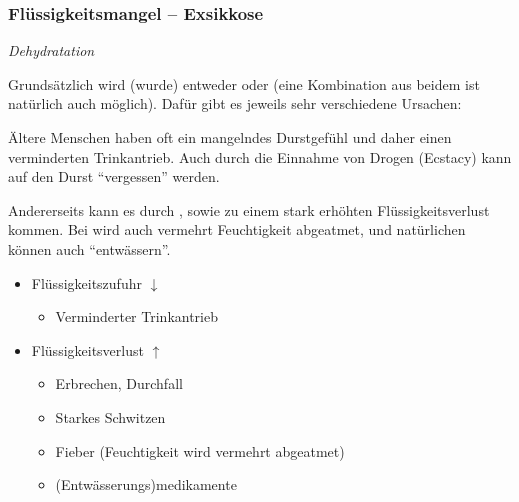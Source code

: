 






\subsubsection{Flüssigkeitsmangel -- Exsikkose}

\emph{ Dehydratation}


Grundsätzlich wird (wurde) entweder 
oder  (eine Kombination aus
beidem ist natürlich auch möglich). Dafür gibt es jeweils sehr verschiedene Ursachen: 

{%
Ältere Menschen haben oft ein mangelndes Durstgefühl und daher
einen verminderten Trinkantrieb. Auch durch die Einnahme von
Drogen (Ecstacy) kann auf den Durst "`vergessen"' werden.  

Andererseits kann es durch , 
sowie  zu einem stark erhöhten
Flüssigkeitsverlust kommen. Bei  wird auch
vermehrt Feuchtigkeit abgeatmet, und natürlichen können
auch  "`entwässern"'.
}{
\begin{itemize} %
  \item Flüssigkeitszufuhr ${\downarrow}$
  \begin{itemize}
    \item Verminderter Trinkantrieb
  \end{itemize}
  \item Flüssigkeitsverlust ${\uparrow}$
  \begin{itemize}
    \item Erbrechen, Durchfall
    \item Starkes Schwitzen
    \item Fieber (Feuchtigkeit wird vermehrt abgeatmet)
    \item (Entwässerungs)medikamente
  \end{itemize}
\end{itemize}
}{}{}{}

